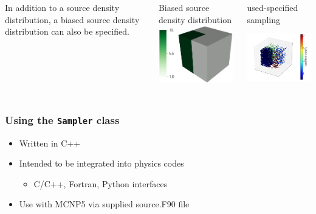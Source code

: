 \documentclass[xcolor=x11names,compress]{beamer}
\begin{document}
\begin{frame}
\begin{columns}[T]
\begin{column}{0.3\textwidth}
\vspace{0.6cm}
{\small In addition to a source density distribution, a biased source density distribution can also be specified.}
\end{column}
\begin{column}{0.3\textwidth}
\begin{block}{\tiny Biased source density distribution}
\vspace{0.2cm}
\includegraphics[height=2.5cm]{sampler_bias.png}
\end{block}
\end{column}
\begin{column}{0.3\textwidth}
\begin{block}{\tiny used-specified sampling}
\includegraphics[height=2.7cm]{sample_user.png}
\end{block}
\end{column}
\end{columns}

\end{frame}

\begin{frame}
\frametitle{Using the \texttt{Sampler} class}
\Large
\begin{itemize}
\item{Written in C++}
\item{Intended to be integrated into physics codes}
  \begin{itemize}
    \large
    \item{C/C++, Fortran, Python interfaces}
  \end{itemize}
\item{Use with MCNP5 via supplied source.F90 file}
\end{itemize}
\end{frame}
\end{document}

